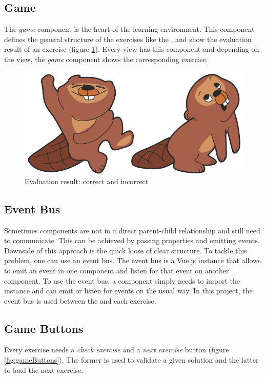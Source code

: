 \subsection*{Game}
The \textit{game} component is the heart of the learning environment. This component defines the general structure of the exercises like the ,  and show the evaluation result of an exercise (figure \ref{fig:evaluationResult}). Every view has this component and depending on the view, the \textit{game} component shows the corresponding exercise.

\begin{figure}[h]
    \centering
    \includegraphics[width=0.5\columnwidth]{figures/evaluation_result.png}
    \caption{Evaluation result: correct and incorrect}
    \label{fig:evaluationResult} 
\end{figure}

\subsection*{Event Bus}
Sometimes components are not in a direct parent-child relationship and still need to communicate. This can be achieved by passing properties and emitting events. Downside of this approach is the quick loose of clear structure. To tackle this problem, one can use an event bus. 
The event bus is a Vue.js instance that allows to emit an event in one component and listen for that event on another component. To use the event bus, a component simply needs to import the instance and can emit or listen for events on the usual way. In this project, the event bus is used between the  and each exercise.

\subsection*{Game Buttons}
\label{subsection:gameButtons}
Every exercise needs a \textit{check exercise} and a \textit{next exercise} button (figure \ref{fig:gameButtons}). The former is used to validate a given solution and the latter to load the next exercise.

